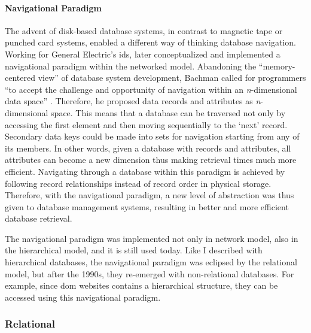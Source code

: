 \paragraph{Navigational Paradigm}
The advent of disk-based database systems, in contrast to magnetic tape or punched card systems, enabled a different way of thinking database navigation. Working for General Electric's \gls{ids}, \textcite{Bachman:1973:PN:355611.362534} later conceptualized and implemented a navigational paradigm within the networked model. Abandoning the ``memory-centered view'' of database system development, Bachman called for programmers ``to accept the challenge and opportunity of navigation within an \textit{n}-dimensional data space'' \parencite[657]{Bachman:1973:PN:355611.362534}. Therefore, he proposed data records and attributes as \textit{n}-dimensional space. This means that a database can be traversed not only by accessing the first element and then moving sequentially to the `next' record. Secondary data keys could be made into sets for navigation starting from any of its members. In other words, given a database with records and attributes, all attributes can become a new dimension thus making retrieval times much more efficient. Navigating through a database within this paradigm is achieved by following record relationships instead of record order in physical storage. Therefore, with the navigational paradigm, a new level of abstraction was thus given to database management systems, resulting in better and more efficient database retrieval.

The navigational paradigm was implemented not only in network model, also in the hierarchical model, and it is still used today. Like I described with hierarchical databases, the navigational paradigm was eclipsed by the relational model, but after the 1990s, they re-emerged with non-relational databases. For example, since \gls{dom} websites contains a hierarchical structure, they can be accessed using this navigational paradigm.

\subsubsection{Relational}
\label{model:relational}


